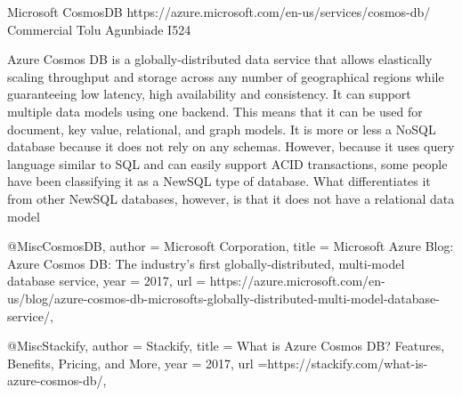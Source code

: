 Microsoft CosmosDB 
https://azure.microsoft.com/en-us/services/cosmos-db/
Commercial 
Tolu Agunbiade 
I524


Azure Cosmos DB is a globally-distributed data service that allows elastically
scaling throughput and storage across any number of geographical regions while
guaranteeing low latency, high availability and consistency\cite{CosmosDB}. It
can support multiple data models using one backend. This means that it can be
used for document, key value, relational, and graph models. It is more or less a
NoSQL database because it does not rely on any schemas. However, because it uses
query language similar to SQL and can easily support ACID transactions, some
people have been classifying it as a NewSQL type of database. What
differentiates it from other NewSQL databases, however, is that it does not have
a relational data model\cite{Stackify}


@Misc{CosmosDB, 
author = {Microsoft Corporation}, 
title = {Microsoft Azure Blog: Azure Cosmos DB: The industry's first globally-distributed, multi-model database service}, 
year = {2017}, 
url = {https://azure.microsoft.com/en-us/blog/azure-cosmos-db-microsofts-globally-distributed-multi-model-database-service/},
}


@Misc{Stackify, 
author = {Stackify}, 
title = {What is Azure Cosmos DB? Features, Benefits, Pricing, and More}, 
year = {2017}, 
url ={https://stackify.com/what-is-azure-cosmos-db/}, 
}
